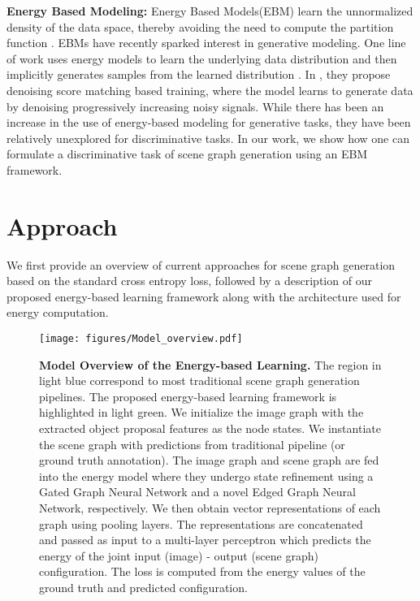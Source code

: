 \documentclass[final]{cvpr}
\begin{document}
\vspace{0.08in}
\noindent
\textbf{Energy Based Modeling:}
Energy Based Models(EBM) learn the unnormalized density of the data space, thereby avoiding the need to compute the partition function \cite{lecun2006tutorial}. EBMs have recently sparked interest in generative modeling. One line of work uses energy models to learn the underlying data distribution and then implicitly generates samples from the learned distribution \cite{du2019implicit, grathwohl2020your}. In \cite{song2019generative}, they propose denoising score matching based training, where the model learns to generate data by denoising progressively increasing noisy signals. While there has been an increase in the use of energy-based modeling for generative tasks, they have been relatively unexplored for discriminative tasks. In our work, we show how one can formulate a discriminative task of scene graph generation using an EBM framework.


\section{Approach}
We first provide an overview of current approaches for scene graph generation based on the standard cross entropy loss, followed by a  description of our proposed energy-based learning framework along with the architecture used for energy computation.
\begin{figure*}[t]
    \centering
    \texttt{[image: figures/Model\_overview.pdf]}
    \caption{\textbf{Model Overview of the Energy-based Learning.} The region in light blue correspond to most traditional scene graph generation pipelines. The proposed energy-based learning framework is highlighted in light green. We initialize the image graph with the extracted object proposal features as the node states. We instantiate the scene graph with
    predictions from traditional pipeline (or ground truth annotation). The image graph and scene graph are fed into the energy model where they undergo state refinement using a Gated Graph Neural Network and a novel Edged Graph Neural Network, respectively. We then obtain vector representations of each graph using pooling layers. The representations are concatenated and passed as input to a multi-layer perceptron which predicts the energy of the joint input (image) - output (scene graph) configuration. The loss is computed from the energy values of the ground truth and predicted configuration. 
}
    \label{fig:model_overview}
\end{figure*}
\end{document}
